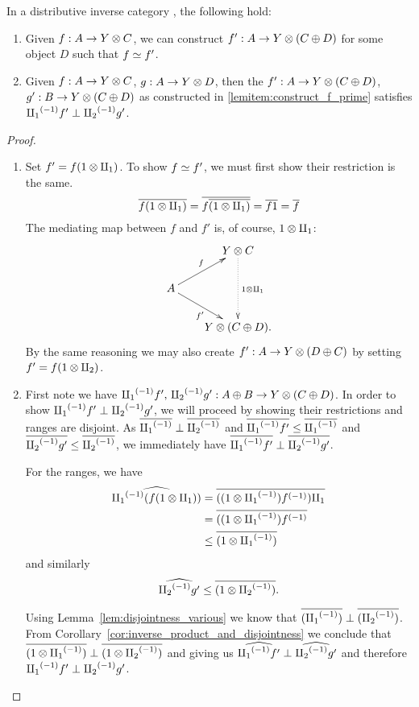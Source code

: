 \begin{lemma}\label{lem:maps_from_disjoint_sums_have_disjoint_equivalences}
  In a distributive inverse category \X, the following hold:
  \begin{enumerate}[{(}i{)}]
    \item Given $f : A \to Y\otimes C$, we can construct $f' : A \to Y \otimes (C\oplus D)$  for some object $D$ such
      that $f \overset{\scriptscriptstyle }{\simeq} f'$.\label{lemitem:construct_f_prime}
    \item Given $f : A \to Y \otimes C$, $g : A\to Y \otimes D$, then the $f' : A \to Y \otimes (C\oplus D)$,
      $g' : B \to Y \otimes (C\oplus D)$ as constructed in  \ref{lemitem:construct_f_prime} satisfies ${\amalg_{1}}^{(-1)} f'
      \perp {\amalg_{2}}^{(-1)} g'$.\label{lemitem:constructed_are_disjoint}
  \end{enumerate}
\end{lemma}
\begin{proof}
  \prepprooflist
  \begin{enumerate}[{(}i{)}]
  \item Set $f' = f(1\otimes\amalg_{1})$.
    To show $f\overset{\scriptscriptstyle }{\simeq} f'$, we must first show their restriction is the same.
    \[
      \overline{f(1\otimes\amalg_{1})} = \overline{f\overline{(1\otimes\amalg_{1})}} = \overline{f 1} =  \overline{f}
    \]
    The mediating map between $f$ and $f'$ is, of course, $1\otimes\amalg_{1}$:
    \[
    \xymatrix @C=20pt @R=20pt{
      &  Y \* C \ar@{.>}[dd]^{1\*\cpa}\\
      A \ar[ur]^f \ar[dr]_{f'} \\
      & Y\*(C\+ D).
    }
    \]
  By the same reasoning we may also create $f':A\to Y\otimes(D\oplus C)$ by setting $f' = f(1\otimes\amalg_{2})$.
  \item First note we have ${\amalg_{1}}^{(-1)} f',\,{\amalg_{2}}^{(-1)} g': A\oplus B \to Y\otimes(C\oplus D)$. In order to show  ${\amalg_{1}}^{(-1)} f'
    \perp {\amalg_{2}}^{(-1)} g'$, we will proceed by showing their restrictions and ranges are disjoint.
    As $\overline{{\amalg_{1}}^{(-1)}} \perp \overline{{\amalg_{2}}^{(-1)}}$ and $\overline{{\amalg_{1}}^{(-1)}f'} \le \overline{{\amalg_{1}}^{(-1)}}$ and
    $\overline{{\amalg_{2}}^{(-1)}g'} \le \overline{{\amalg_{2}}^{(-1)}}$, we immediately have
    $\overline{{\amalg_{1}}^{(-1)}f'} \perp \overline{{\amalg_{2}}^{(-1)}g'}$.

    For the ranges, we have
    \begin{align*}
      \widehat{{\amalg_{1}}^{(-1)} (f (1\otimes\amalg_{1}))} &=
      \overline{((1\otimes{\amalg_{1}}^{(-1)}){f}^{(-1)})\amalg_{1}}\\
      &= \overline{((1\otimes{\amalg_{1}}^{(-1)}){f}^{(-1)}}\\
      &\le \overline{(1\otimes{\amalg_{1}}^{(-1)})}
    \end{align*}
    and similarly
    \[
      \widehat{{\amalg_{2}}^{(-1)} g'} \le \overline{(1\otimes{\amalg_{2}}^{(-1)})}.
    \]

    Using Lemma~\ref{lem:disjointness_various}
    we know that $\overline{({\amalg_{1}}^{(-1)})}\perp \overline{({\amalg_{2}}^{(-1)})}$. From
    Corollary~\ref{cor:inverse_product_and_disjointness}
    we conclude that $\overline{(1\otimes{\amalg_{1}}^{(-1)})}\perp \overline{(1\otimes{\amalg_{2}}^{(-1)})}$ and giving us
    $\widehat{{\amalg_{1}}^{(-1)}f'} \perp \widehat{{\amalg_{2}}^{(-1)}g'}$ and therefore ${\amalg_{1}}^{(-1)}f' \perp {\amalg_{2}}^{(-1)}g'$.
  \end{enumerate}
\end{proof}
